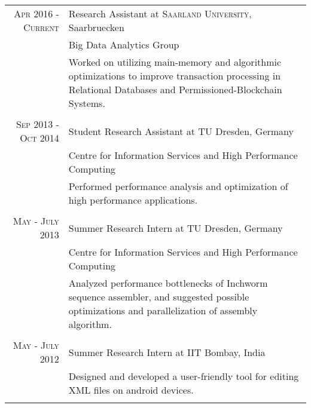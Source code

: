 \documentclass[a4paper,10pt]{article} %
\begin{document}
\begin{tabular}{r|p{11cm}}
\textsc{Apr 2016 - Current} & Research Assistant at \textsc{Saarland University}, Saarbruecken \\
                         & Big Data Analytics Group\\ 
& \footnotesize{Worked on utilizing  main-memory and algorithmic optimizations to improve transaction processing in Relational Databases and Permissioned-Blockchain Systems.}\\
\multicolumn{2}{c}{} \\


\textsc{Sep 2013 - Oct 2014} & Student Research Assistant at \textsc{TU} Dresden, Germany \emph{}\\
                         & Centre for Information Services and High Performance Computing\\ 
& \footnotesize{Performed performance analysis and  optimization of high performance applications.}\\
\multicolumn{2}{c}{} \\


\textsc{May - July 2013} & Summer Research Intern at \textsc{TU} Dresden, Germany \emph{}\\
                         & Centre for Information Services and High Performance Computing\\ 
& \footnotesize{Analyzed performance bottlenecks of Inchworm sequence assembler, and suggested possible optimizations and parallelization of assembly algorithm.}\\
\multicolumn{2}{c}{} \\


\textsc{May - July 2012} & Summer Research Intern at \textsc{IIT} Bombay, India \emph{}\\
& \footnotesize{Designed and developed a user-friendly tool for editing XML files on android devices.}\\
\multicolumn{2}{c}{}
\end{tabular}

\end{document}
